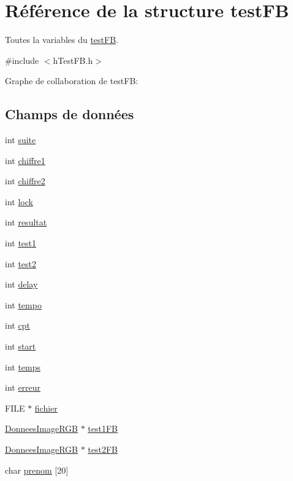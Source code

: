\hypertarget{structtest_f_b}{}\section{Référence de la structure test\+FB}
\label{structtest_f_b}


Toutes la variables du \hyperlink{structtest_f_b}{test\+FB}.  




{\ttfamily \#include $<$h\+Test\+F\+B.\+h$>$}



Graphe de collaboration de test\+FB\+:
\subsection*{Champs de données}
\begin{DoxyCompactItemize}
\item 
int \hyperlink{structtest_f_b_a514b694eb0819995854779f7f7fc2422}{suite}
\item 
int \hyperlink{structtest_f_b_a356f4fce8c2f522fd08f4c45a5f59570}{chiffre1}
\item 
int \hyperlink{structtest_f_b_a993aa24e718fb4568cd55d88feecb851}{chiffre2}
\item 
int \hyperlink{structtest_f_b_ae5894b1b7d2f0cd2fdbef84240db5110}{lock}
\item 
int \hyperlink{structtest_f_b_a44413d12389c0a742dbe1e0df4c104cc}{resultat}
\item 
int \hyperlink{structtest_f_b_afa42eb35c54a2f27711057c5ef41237a}{test1}
\item 
int \hyperlink{structtest_f_b_a8f0856b06ab5e0822da706e8ed6f6e6e}{test2}
\item 
int \hyperlink{structtest_f_b_afce45aec2fc30e60d9261d5f5a3975d5}{delay}
\item 
int \hyperlink{structtest_f_b_ac9594af7975494d3f8c232458f72ee38}{tempo}
\item 
int \hyperlink{structtest_f_b_aa9a520b6a87fe214467f1ab30e4cab53}{cpt}
\item 
int \hyperlink{structtest_f_b_aac9d3e0a5715c139234b32c99674b7f5}{start}
\item 
int \hyperlink{structtest_f_b_a083d19395309503e328224aa35646a8e}{temps}
\item 
int \hyperlink{structtest_f_b_ae27714bfada1c6176b1af512491dbd00}{erreur}
\item 
F\+I\+LE $\ast$ \hyperlink{structtest_f_b_a01c630238bb34a5c67ef08ece202b178}{fichier}
\item 
\hyperlink{struct_donnees_image_r_g_b}{Donnees\+Image\+R\+GB} $\ast$ \hyperlink{structtest_f_b_aa30ded6b44a96238652680412a3c2f75}{test1\+FB}
\item 
\hyperlink{struct_donnees_image_r_g_b}{Donnees\+Image\+R\+GB} $\ast$ \hyperlink{structtest_f_b_a42c97c44463c946d8112f72736bb2fc5}{test2\+FB}
\item 
char \hyperlink{structtest_f_b_abc1010cb9ea68c3a6f4198c8f5cc8446}{prenom} \mbox{[}20\mbox{]}
\end{DoxyCompactItemize}



